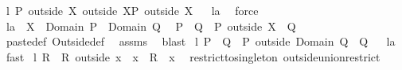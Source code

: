 \begin{isabellebody}
{\isafoldproof}%
%
\isadelimproof
%
\endisadelimproof
\isanewline
\isanewline
{}\isamarkupfalse%
\ l{}{}{\isacharcolon}\ {\isachardoublequoteopen}{\isacharparenleft}P\ outside\ X{\isacharparenright}\ outside\ X{\isacharequal}P\ outside\ X{\isachardoublequoteclose}%
\isadelimproof
\ %
\endisadelimproof
%
\isatagproof
{}\isamarkupfalse%
\ l{}{}a\ \isamarkupfalse%
\ force%
\endisatagproof
{\isafoldproof}%
%
\isadelimproof
%
\endisadelimproof
\ \isanewline
\isanewline
{}\isamarkupfalse%
\ l{}{}a{\isacharcolon}\ \ {\isachardoublequoteopen}X\ {\isasyminter}\ Domain\ P\ {\isasymsubseteq}\ Domain\ Q{\isachardoublequoteclose}\ \ \isanewline
{\isachardoublequoteopen}P\ {\isacharplus}{\isacharasterisk}\ Q\ {\isacharequal}\ {\isacharparenleft}P\ outside\ X{\isacharparenright}\ {\isacharplus}{\isacharasterisk}\ Q{\isachardoublequoteclose}%
\isadelimproof
\ %
\endisadelimproof
%
\isatagproof
{}\isamarkupfalse%
\ paste{\isacharunderscore}def\ Outside{\isacharunderscore}def\ \isamarkupfalse%
\ assms\ \isamarkupfalse%
\ blast%
\endisatagproof
{\isafoldproof}%
%
\isadelimproof
%
\endisadelimproof
\isanewline
\isanewline
{}\isamarkupfalse%
\ l{}{}{\isacharcolon}\ {\isachardoublequoteopen}P\ {\isacharplus}{\isacharasterisk}\ Q\ {\isacharequal}\ {\isacharparenleft}P\ outside\ {\isacharparenleft}Domain\ Q{\isacharparenright}{\isacharparenright}\ {\isacharplus}{\isacharasterisk}\ Q{\isachardoublequoteclose}%
\isadelimproof
\ %
\endisadelimproof
%
\isatagproof
{}\isamarkupfalse%
\ l{}{}a\ \isamarkupfalse%
\ fast%
\endisatagproof
{\isafoldproof}%
%
\isadelimproof
%
\endisadelimproof
\isanewline
\isanewline
{}\isamarkupfalse%
\ l{}{}{\isacharcolon}\ {\isachardoublequoteopen}R\ {\isacharequal}\ {\isacharparenleft}R\ outside\ {\isacharbraceleft}x{\isacharbraceright}{\isacharparenright}\ {\isasymunion}\ {\isacharparenleft}{\isacharbraceleft}x{\isacharbraceright}\ {\isasymtimes}\ {\isacharparenleft}R\ {\isacharbackquote}{\isacharbackquote}\ {\isacharbraceleft}x{\isacharbraceright}{\isacharparenright}{\isacharparenright}{\isachardoublequoteclose}\ \isanewline
%
\isadelimproof
%
\endisadelimproof
%
\isatagproof
{}\isamarkupfalse%
\ restrict{\isacharunderscore}to{\isacharunderscore}singleton\ outside{\isacharunderscore}union{\isacharunderscore}restrict\ \isamarkupfalse%

\end{isabellebody}
